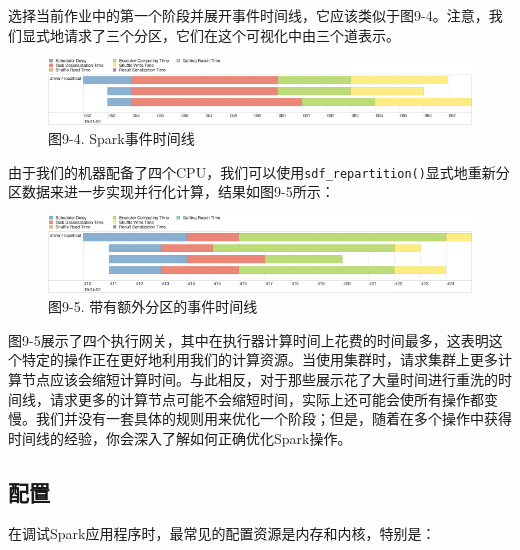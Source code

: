 \documentclass[
]{article}
\newenvironment{Shaded}{\begin{snugshade}}{\end{snugshade}}
\newcommand{\DecValTok}[1]{\textcolor[rgb]{0.00,0.00,0.81}{#1}}
\newcommand{\KeywordTok}[1]{\textcolor[rgb]{0.13,0.29,0.53}{\textbf{#1}}}
\newcommand{\NormalTok}[1]{#1}
\newcommand{\OperatorTok}[1]{\textcolor[rgb]{0.81,0.36,0.00}{\textbf{#1}}}
\newcommand{\StringTok}[1]{\textcolor[rgb]{0.31,0.60,0.02}{#1}}
\begin{document}
选择当前作业中的第一个阶段并展开事件时间线，它应该类似于图9-4。注意，我们显式地请求了三个分区，它们在这个可视化中由三个道表示。

\begin{figure}
\centering
\includegraphics{figures/9_4.png}
\caption{图9-4. Spark事件时间线}
\end{figure}

由于我们的机器配备了四个CPU，我们可以使用\texttt{sdf\_repartition()}显式地重新分区数据来进一步实现并行化计算，结果如图9-5所示：

\begin{Shaded}
\end{Shaded}

\begin{figure}
\centering
\includegraphics{figures/9_5.png}
\caption{图9-5. 带有额外分区的事件时间线}
\end{figure}

图9-5展示了四个执行网关，其中在执行器计算时间上花费的时间最多，这表明这个特定的操作正在更好地利用我们的计算资源。当使用集群时，请求集群上更多计算节点应该会缩短计算时间。与此相反，对于那些展示花了大量时间进行重洗的时间线，请求更多的计算节点可能不会缩短时间，实际上还可能会使所有操作都变慢。我们并没有一套具体的规则用来优化一个阶段；但是，随着在多个操作中获得时间线的经验，你会深入了解如何正确优化Spark操作。

\hypertarget{ux914dux7f6e}{%
\subsection{配置}\label{ux914dux7f6e}}

在调试Spark应用程序时，最常见的配置资源是内存和内核，特别是：
\end{document}
